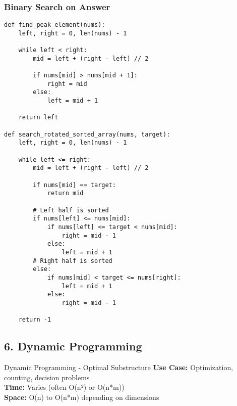 \documentclass[10pt,a4paper]{article}
\begin{document}
\subsubsection{Binary Search on Answer}
\begin{lstlisting}
def find_peak_element(nums):
    left, right = 0, len(nums) - 1

    while left < right:
        mid = left + (right - left) // 2

        if nums[mid] > nums[mid + 1]:
            right = mid
        else:
            left = mid + 1

    return left

def search_rotated_sorted_array(nums, target):
    left, right = 0, len(nums) - 1

    while left <= right:
        mid = left + (right - left) // 2

        if nums[mid] == target:
            return mid

        # Left half is sorted
        if nums[left] <= nums[mid]:
            if nums[left] <= target < nums[mid]:
                right = mid - 1
            else:
                left = mid + 1
        # Right half is sorted
        else:
            if nums[mid] < target <= nums[right]:
                left = mid + 1
            else:
                right = mid - 1

    return -1
\end{lstlisting}

\subsection{6. Dynamic Programming}

\begin{patternbox}{Dynamic Programming - Optimal Substructure}
\textbf{Use Case:} Optimization, counting, decision problems\\
\textbf{Time:} Varies (often O(n²) or O(n*m))\\
\textbf{Space:} O(n) to O(n*m) depending on dimensions
\end{patternbox}
\end{document}
